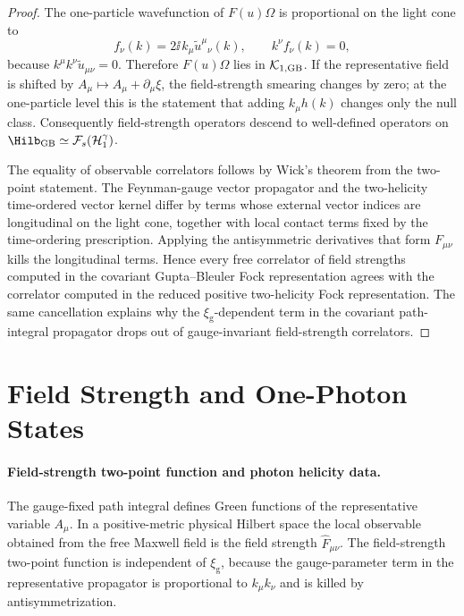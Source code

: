 \begin{proof}
The one-particle wavefunction of \(F(u)\Omega\) is proportional on the light
cone to
\[
  f_\nu(k)
  =
  2\ii\,k_\mu\widetilde u^{\mu}{}_{\nu}(k),
  \qquad
  k^\nu f_\nu(k)=0,
\]
because \(k^\mu k^\nu\widetilde u_{\mu\nu}=0\).  Therefore \(F(u)\Omega\)
lies in \(\mathcal K_{1,{\rm GB}}\).  If the representative field is shifted
by \(A_\mu\mapsto A_\mu+\partial_\mu\xi\), the field-strength smearing
changes by zero; at the one-particle level this is the statement that adding
\(k_\mu h(k)\) changes only the null class.  Consequently field-strength
operators descend to well-defined operators on
\(\Hilb_{\rm GB}\simeq\mathcal F_s(\mathcal H_1^\gamma)\).

The equality of observable correlators follows by Wick's theorem from the
two-point statement.  The Feynman-gauge vector propagator and the
two-helicity time-ordered vector kernel differ by terms whose external vector
indices are longitudinal on the light cone, together with local contact terms
fixed by the time-ordering prescription.  Applying the antisymmetric
derivatives that form \(F_{\mu\nu}\) kills the longitudinal terms.  Hence
every free correlator of field strengths computed in the covariant
Gupta--Bleuler Fock representation agrees with the correlator computed in the
reduced positive two-helicity Fock representation.  The same cancellation
explains why the \(\xi_{\mathrm g}\)-dependent term in the covariant
path-integral propagator drops out of gauge-invariant field-strength
correlators.
\end{proof}

\section{Field Strength and One-Photon States}

\paragraph{Field-strength two-point function and photon helicity data.}
The gauge-fixed path integral defines Green functions of the representative
variable \(A_\mu\). In a positive-metric physical Hilbert space the local
observable obtained from the free Maxwell field is the field strength
\(\widehat F_{\mu\nu}\). The field-strength two-point function is independent
of \(\xi_{\mathrm g}\), because the gauge-parameter term in the representative
propagator is proportional to \(k_\mu k_\nu\) and is killed by
antisymmetrization.

